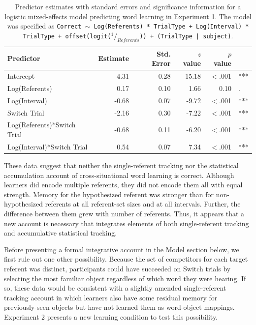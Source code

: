 \documentclass[authoryear,review]{elsarticle}
\begin{document}
\begin{table}[tb]
\begin{center}
\begin{tabular}{lrrrrl}
 Predictor & Estimate & Std. Error & $z$ value & $p$ value &  \\ 
  \hline
  Intercept & 4.31 & 0.28 & 15.18 & $<$.001 & *** \\ 
  Log(Referents) & 0.17 & 0.10 & 1.66 & 0.10 & . \\ 
  Log(Interval) & -0.68 & 0.07 & -9.72 & $<$.001 & *** \\ 
  Switch Trial & -2.16 & 0.30 & -7.22 & $<$.001 & *** \\ 
  Log(Referents)*Switch Trial & -0.68 & 0.11 & -6.20 & $<$.001 & *** \\ 
  Log(Interval)*Switch Trial & 0.54 & 0.07 & 7.34 & $<$.001 & *** \\ 
   \hline
\end{tabular}\end{center}
\vspace{6pt}
\caption{\label{tab:exp1_reg}Predictor estimates with standard errors and significance information for a logistic mixed-effects model predicting word learning in Experiment 1. The model was specified as {\tt{Correct $\sim$ Log(Referents) * TrialType + Log(Interval) * TrialType + offset(logit($^1/_{Referents}$)) + (TrialType | subject)}}.}
\end{table}

These data suggest that neither the single-referent tracking nor the statistical accumulation account of cross-situational word learning is correct. Although learners did encode multiple referents, they did not encode them all with equal strength. Memory for the hypothesized referent was stronger than for non-hypothesized referents at all referent-set sizes and at all intervals. Further, the difference between them grew with number of referents. Thus, it appears that a new account is necessary that integrates elements of both single-referent tracking and accumulative statistical tracking.

Before presenting a formal integrative account in the Model section below, we first rule out one other possibility. Because the set of competitors for each target referent was distinct, participants could have succeeded on Switch trials by selecting the most familiar object regardless of which word they were hearing. If so, these data would be consistent with a slightly amended single-referent tracking account in which learners also have some residual memory for previously-seen objects but have not learned them as word-object mappings. Experiment 2 presents a new learning condition to test this possibility.
\end{document}

